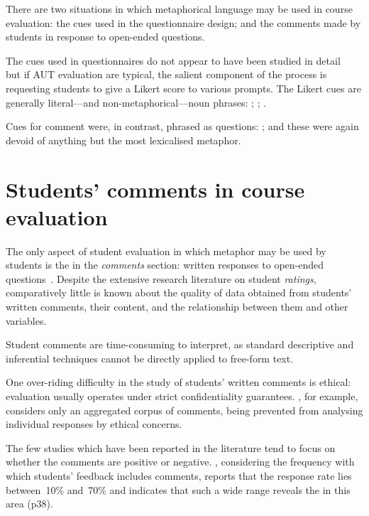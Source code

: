 There are two situations in which metaphorical language may be used in
course evaluation: the cues used in the questionnaire design; and the
comments made by students in response to open-ended questions.

The cues used in questionnaires do not appear to have been studied in
detail~\citep{aleamoni1980} but if AUT evaluation are typical, the
salient component of the process is requesting students to give a
Likert score to various prompts.  The Likert cues are generally
literal---and non-metaphorical---noun phrases: ; ; .

Cues for comment were, in contrast, phrased as questions: ;  and these were again devoid
of anything but the most lexicalised metaphor.

\section{Students' comments in course evaluation}

The only aspect of student evaluation in which metaphor may be used by
students is the in the \emph{comments} section: written responses to
open-ended questions~\citep{stewart2015}.  Despite the extensive
research literature on student \emph{ratings}, comparatively little is
known about the quality of data obtained from students' written
comments, their content, and the relationship between them and other
variables.

Student comments are time-consuming to interpret, as standard
descriptive and inferential techniques cannot be directly applied to
free-form text.

One over-riding difficulty in the study of students' written comments
is ethical: evaluation usually operates under strict confidentiality
guarantees.  , for example, considers only an
aggregated corpus of comments, being prevented from analysing
individual responses by ethical concerns.

The few studies which have been reported in the literature tend to
focus on whether the comments are positive or negative.
, considering the frequency with which students'
feedback includes comments, reports that the response rate lies
between~10\% and~70\% and indicates that such a wide range reveals the
 in this area (p38).

